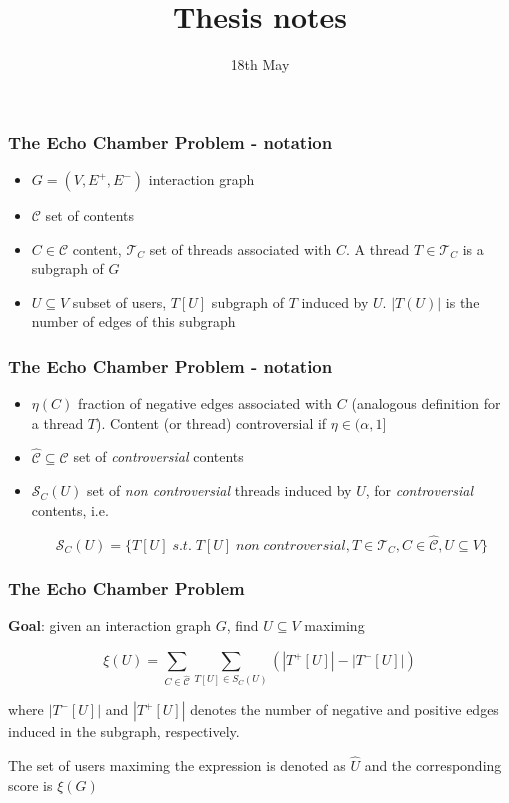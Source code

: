 \documentclass{beamer}
\title{Thesis notes}
\date{18th May}
\begin{document}
\frame{\titlepage}

\begin{frame}[c]
	\frametitle{The Echo Chamber Problem - notation}

	\begin{itemize}
		\item $G = (V, E ^{+}, E ^{-}) $ interaction graph
		\item $ \mathcal{C} $ set of contents
		\item $C \in \mathcal{C} $ content, $\mathcal{T} _{C} $ set of threads
		      associated with $C$. A thread $T \in \mathcal{T} _{C} $ is a
		      subgraph of $G$
		\item $U \subseteq V$ subset of users, $T[U]$ subgraph of $T$ induced
		      by $U$. $|T(U)|$ is the number of edges of this subgraph
	\end{itemize}
\end{frame}

\begin{frame}[c]
	\frametitle{The Echo Chamber Problem - notation}
	\begin{itemize}
		\item $\eta(C)$ fraction of negative edges associated with $C$
		      (analogous definition for a thread $T$). Content (or thread)
		      controversial if $\eta \in (\alpha, 1]$
		\item $\hat{\mathcal{C} } \subseteq \mathcal{C} $ set of \textit{controversial}
		      contents

		\item $\mathcal{S} _C (U)$ set of \textit{non controversial} threads
		      induced by $U$, for \textit{controversial} contents, i.e.

			      {\small
				      \begin{equation}
					      \mathcal{S} _{C} (U) = \{ T[U] \; s.t. \; T[U] \; non \;
					      controversial, T \in \mathcal{T} _{C}, C
					      \in \hat{\mathcal{C}}, U \subseteq V\}
				      \end{equation}
			      }
	\end{itemize}

\end{frame}

\begin{frame}[c]
	\frametitle{The Echo Chamber Problem}
	\textbf{Goal}: given an interaction graph $G$, find $U \subseteq V$ maximing

	\begin{equation}
		\xi (U) = \sum^{}_{C \in \hat{\mathcal{C}} } \sum^{}_{T[U] \in S_C (U)}
		(| T^{+} [U] | - | T^{-} [U] |)
	\end{equation}

	where $| T^{-} [U] |$ and $| T^{+} [U] |$ denotes the number of negative
	and positive edges induced in the subgraph, respectively.

	\bigskip

	The set of users maximing the expression is denoted as $\hat{U}$ and the
	corresponding score is $\xi(G)$
\end{frame}
\end{document}
